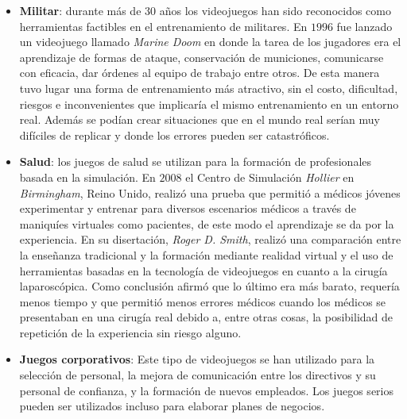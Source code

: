 \begin{itemize}

\item \textbf{Militar}: durante más de $30$ años los videojuegos han sido
    reconocidos como herramientas factibles en el entrenamiento de militares. En
    $1996$ fue lanzado un videojuego llamado \emph{Marine Doom} en donde la
    tarea de los jugadores era el aprendizaje de formas de ataque, conservación
    de municiones, comunicarse con eficacia, dar órdenes al equipo de trabajo
    entre otros. De esta manera tuvo lugar una forma de entrenamiento más
    atractivo, sin el costo, dificultad, riesgos e inconvenientes que implicaría
    el mismo entrenamiento en un entorno real. Además se podían crear
    situaciones que en el mundo real serían muy difíciles de replicar y donde
    los errores pueden ser catastróficos\cite{education:games}.

\item \textbf{Salud}: los juegos de salud se utilizan para la formación de
    profesionales basada en la simulación. En $2008$ el Centro de Simulación
    \emph{Hollier} en \emph{Birmingham}, Reino Unido, realizó una prueba que
    permitió a médicos jóvenes experimentar y entrenar para diversos escenarios
    médicos a través de maniquíes virtuales como pacientes, de este modo el
    aprendizaje se da por la experiencia. En su disertación, \emph{Roger D.
        Smith}, realizó una comparación entre la enseñanza tradicional y la
    formación mediante realidad virtual y el uso de herramientas basadas en la
    tecnología de videojuegos en cuanto a la cirugía laparoscópica. Como
    conclusión afirmó que lo último era más barato, requería menos tiempo y que
    permitió menos errores médicos cuando los médicos se presentaban en una
    cirugía real debido a, entre otras cosas, la posibilidad de repetición de la
    experiencia sin riesgo alguno\cite{education:games}. 

\item \textbf{Juegos corporativos}: Este tipo de videojuegos se han utilizado
    para la selección de personal, la mejora de comunicación entre los
    directivos y su personal de confianza, y la formación de nuevos empleados.
    Los juegos serios pueden ser utilizados incluso para elaborar planes de
    negocios\cite{education:games}. 

\end{itemize}

